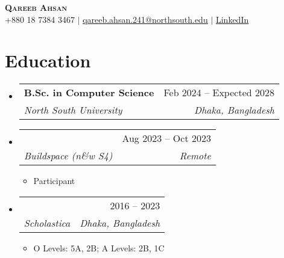 \documentclass[letterpaper,11pt]{article}
\makeatletter
\newcommand{\resumeItem}[1]{
  \item\small{
    {#1 \vspace{-2pt}}
  }
}
\newcommand{\resumeSubheading}[4]{
  \vspace{-2pt}\item
    \begin{tabular*}{0.97\textwidth}[t]{l@{\extracolsep{\fill}}r}
      \textbf{#1} & #2 \\
      \textit{\small#3} & \textit{\small #4} \\
    \end{tabular*}\vspace{-7pt}
}
\newcommand{\resumeSubHeadingListStart}{\begin{itemize}[leftmargin=0.15in, label={}]}
\newcommand{\resumeSubHeadingListEnd}{\end{itemize}}
\newcommand{\resumeItemListStart}{\begin{itemize}}
\newcommand{\resumeItemListEnd}{\end{itemize}\vspace{-5pt}}
\makeatother
\begin{document}
\begin{center}
    \textbf{\Huge \scshape Qareeb Ahsan} \\ \vspace{1pt}
    \small +880 18 7384 3467 $|$ \href{mailto:qareeb.ahsan.241@northsouth.edu}{\underline{qareeb.ahsan.241@northsouth.edu}} $|$ \href{https://linkedin.com/in/qareebahsan}{\underline{LinkedIn}}
\end{center}

\section{Education}
  \resumeSubHeadingListStart
    \resumeSubheading
      {B.Sc. in Computer Science}{Feb 2024 -- Expected 2028}
      {North South University}{Dhaka, Bangladesh}
    \resumeSubheading
      {}{Aug 2023 -- Oct 2023}
      {Buildspace (n\&w S4)}{Remote}
      \resumeItemListStart
        \resumeItem{Participant}
      \resumeItemListEnd
    \resumeSubheading
      {}{2016 -- 2023}
      {Scholastica}{Dhaka, Bangladesh}
      \resumeItemListStart
        \resumeItem{O Levels: 5A, 2B; A Levels: 2B, 1C}
      \resumeItemListEnd
  \resumeSubHeadingListEnd

\end{document}
